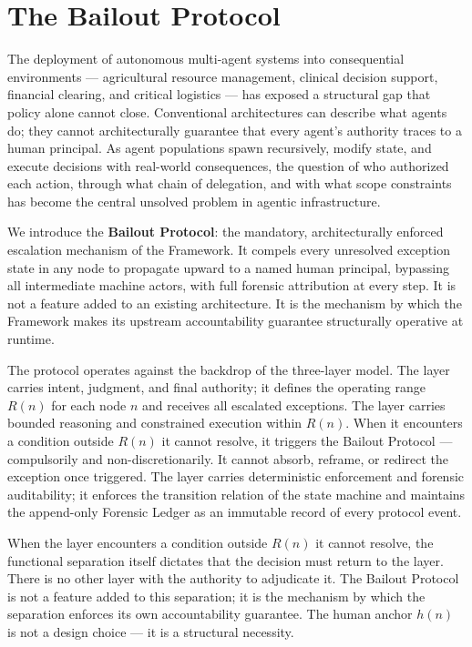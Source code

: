 \section{The Bailout Protocol}
\label{sec:bailout}

The deployment of autonomous multi-agent systems into consequential environments — agricultural resource management, clinical decision support, financial clearing, and critical logistics — has exposed a structural gap that policy alone cannot close. Conventional architectures can describe what agents do; they cannot architecturally guarantee that every agent's authority traces to a human principal. As agent populations spawn recursively, modify state, and execute decisions with real-world consequences, the question of who authorized each action, through what chain of delegation, and with what scope constraints has become the central unsolved problem in agentic infrastructure.

We introduce the \textbf{Bailout Protocol}: the mandatory, architecturally enforced escalation mechanism of the \bxthree{} Framework. It compels every unresolved exception state in any \bxthree{} node to propagate upward to a named human principal, bypassing all intermediate machine actors, with full forensic attribution at every step. It is not a feature added to an existing architecture. It is the mechanism by which the \bxthree{} Framework makes its upstream accountability guarantee structurally operative at runtime.

The protocol operates against the backdrop of the \bxthree{} three-layer model. The \purpose{} layer carries intent, judgment, and final authority; it defines the operating range $R(n)$ for each node $n$ and receives all escalated exceptions. The \bounds{} layer carries bounded reasoning and constrained execution within $R(n)$. When it encounters a condition outside $R(n)$ it cannot resolve, it triggers the Bailout Protocol — compulsorily and non-discretionarily. It cannot absorb, reframe, or redirect the exception once triggered. The \fact{} layer carries deterministic enforcement and forensic auditability; it enforces the transition relation of the state machine and maintains the append-only Forensic Ledger as an immutable record of every protocol event.

When the \bounds{} layer encounters a condition outside $R(n)$ it cannot resolve, the functional separation itself dictates that the decision must return to the \purpose{} layer. There is no other layer with the authority to adjudicate it. The Bailout Protocol is not a feature added to this separation; it is the mechanism by which the separation enforces its own accountability guarantee. The human anchor $h(n)$ is not a design choice — it is a structural necessity.

